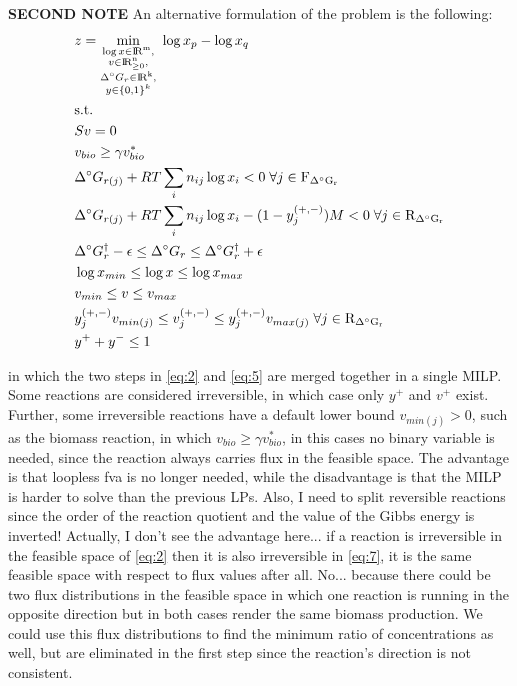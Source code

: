 \documentclass[12pt]{article}
\begin{document}
  \noindent \textbf{SECOND NOTE}
  An alternative formulation of the problem is the following:
  \begin{align}
    \begin{aligned}
      \label{eq:8}
      &z = \min_{\substack{ \log{x} \in \rm I\!R^m, \\
                            v \in \rm I\!R^n_{\geq 0}, \\
                            \Delta^{\circ} G_{r} \in \rm I\!R^k, \\
                            y \in \{0, 1\}^k }} \; \log{x_p} - \log{x_q}
      \\
      &\mathrm{s.t.}
      \\
      &Sv = 0
      \\
      &v_{bio} \geq \gamma v^*_{bio}
      \\
      &\Delta^{\circ} G_{r(j)} + RT \sum_i n_{ij} \log{x_i} < 0 \; \forall j \in \mathrm{F_{\Delta^{\circ} G_{r}}}
      \\
      &\Delta^{\circ} G_{r(j)} + RT \sum_i n_{ij} \log{x_i} - (1 - y_j^{(+, -)})M< 0 \; \forall j \in \mathrm{R_{\Delta^{\circ} G_{r}}}
      \\
      &\Delta^{\circ} G_{r}^{\dagger} - \epsilon \leq \Delta^{\circ} G_{r} \leq \Delta^{\circ} G_{r}^{\dagger} + \epsilon
      \\
      &\log{x}_{min} \leq \log{x} \leq \log{x}_{max}
      \\
      &v_{min} \leq v \leq v_{max}
      \\
      &y_j^{(+, -)} v_{min(j)} \leq v^{(+, -)}_j \leq y_j^{(+, -)} v_{max(j)} \; \forall j \in \mathrm{R_{\Delta^{\circ} G_{r}}}
      \\
      &y^+ + y^- \leq 1
    \end{aligned}
  \end{align}

  \noindent in which the two steps in \ref{eq:2} and \ref{eq:5} are merged together in a single MILP. Some reactions are considered irreversible, in which case only $y^+$ and $v^+$ exist. Further, some irreversible reactions have a default lower bound $v_{min(j)} > 0$, such as the biomass reaction, in which $v_{bio} \geq \gamma v^*_{bio}$, in this cases no binary variable is needed, since the reaction always carries flux in the feasible space. The advantage is that loopless fva is no longer needed, while the disadvantage is that the MILP is harder to solve than the previous LPs. Also, I need to split reversible reactions since the order of the reaction quotient and the value of the Gibbs energy is inverted! Actually, I don't see the advantage here... if a reaction is irreversible in the feasible space of \ref{eq:2} then it is also irreversible in \ref{eq:7}, it is the same feasible space with respect to flux values after all. No... because there could be two flux distributions in the feasible space in which one reaction is running in the opposite direction but in both cases render the same biomass production. We could use this flux distributions to find the minimum ratio of concentrations as well, but are eliminated in the first step since the reaction's direction is not consistent.
\end{document}
